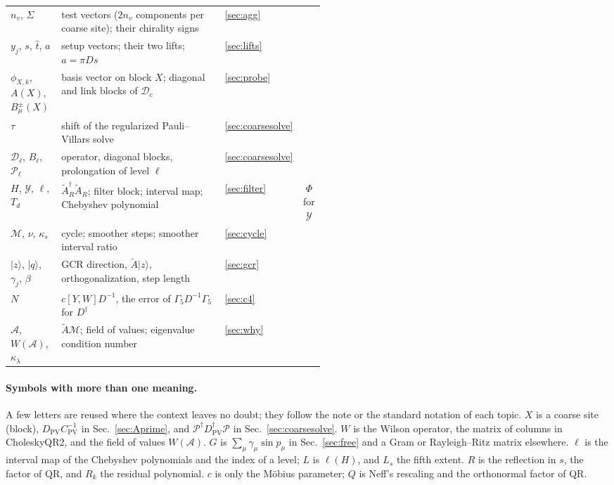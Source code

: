\documentclass[11pt,a4paper]{article}
\numberwithin{equation}{section}
\newcommand{\dg}{^{\dagger}}
\newcommand{\Dpv}{D_{\mathrm{PV}}}
\newcommand{\Cpv}{C_{\mathrm{PV}}}
\newcommand{\Gfive}{\Gamma_5}
\newcommand{\AR}{\tilde A_{R}}
\newcommand{\Pro}{\mathcal P}
\newcommand{\Dc}{\mathcal D_{\mathrm c}}
\begin{document}
\begin{center}
\begin{tabular}{@{}lp{0.52\linewidth}lc@{}}
$n_v$, $\Sigma$ & test vectors ($2n_v$ components per coarse site); their chirality signs & \ref{sec:agg} & \\
$y_j$, $s$, $\hat t$, $a$ & setup vectors; their two lifts; $a=\pi Ds$ & \ref{sec:lifts} & \\
$\phi_{X,k}$, $A(X)$, $B^\pm_\mu(X)$ & basis vector on block $X$; diagonal and link blocks of $\Dc$ & \ref{sec:probe} & \\
$\tau$ & shift of the regularized Pauli--Villars solve & \ref{sec:coarsesolve} & \\
$\mathcal D_\ell$, $B_\ell$, $\Pro_\ell$ & operator, diagonal blocks, prolongation of level $\ell$ & \ref{sec:coarsesolve} & \\
$H$, $\mathcal Y$, $\ell$, $T_d$ & $\AR\dg\AR$; filter block; interval map; Chebyshev polynomial & \ref{sec:filter} & $\Phi$ for $\mathcal Y$\\
$\mathcal M$, $\nu$, $\kappa_s$ & cycle; smoother steps; smoother interval ratio & \ref{sec:cycle} & \\
$|z\rangle$, $|q\rangle$, $\gamma_j$, $\beta$ & GCR direction, $\tilde A|z\rangle$, orthogonalization, step length & \ref{sec:gcr} & \\
$N$ & $c[Y,W]D^{-1}$, the error of $\Gfive D^{-1}\Gfive$ for $D\dg$ & \ref{sec:c4} & \\
$\mathcal A$, $W(\mathcal A)$, $\kappa_\lambda$ & $\tilde A\mathcal M$; field of values; eigenvalue condition number & \ref{sec:why} & \\
\bottomrule
\end{tabular}
\end{center}
\paragraph{Symbols with more than one meaning.} A few letters are reused where the context
leaves no doubt; they follow the note or the standard notation of each topic.
$X$ is a coarse site (block), $\Dpv\Cpv^{-1}$ in Sec.~\ref{sec:Aprime}, and
$\Pro\dg\Dpv\dg\Pro$ in Sec.~\ref{sec:coarsesolve}. $W$ is the Wilson operator, the matrix of
columns in CholeskyQR2, and the field of values $W(\mathcal A)$. $G$ is $\sum_\mu\gamma_\mu\sin p_\mu$
in Sec.~\ref{sec:free} and a Gram or Rayleigh--Ritz matrix elsewhere. $\ell$ is the interval map
of the Chebyshev polynomials and the index of a level; $L$ is $\ell(H)$, and $L_s$ the fifth
extent. $R$ is the reflection in $s$, the factor of QR, and $R_k$ the residual polynomial. $c$ is
only the M\"obius parameter; $Q$ is Neff's rescaling and the orthonormal factor of QR.
\end{document}
